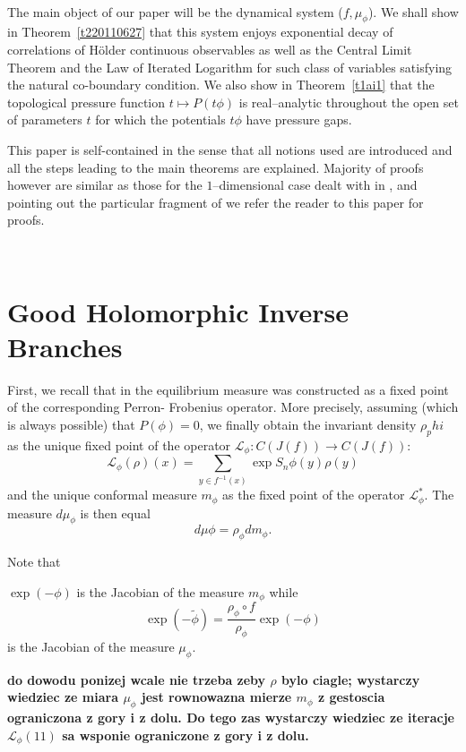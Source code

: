\documentclass[12pt]{amsart}
\numberwithin{equation}{section}
\newcommand{\nl}{\newline}
\def\1{1\!\!1}
\def\sp{\medskip}             \def\fr{\noindent}        \def\nl{\newline}
\begin{document}
\

\fr The main object of our paper will be the dynamical system
($f,\mu_\phi$). We shall show in Theorem~\ref{t220110627} that this
system enjoys exponential 
decay of correlations of H\"older continuous observables as well as
the Central Limit Theorem and the Law of Iterated Logarithm for such
class of variables satisfying the natural co-boundary condition. We
also show in Theorem~\ref{t1ai1} that the topological pressure
function $t\mapsto P(t\phi)$ 
is real--analytic throughout the open set of parameters $t$ for which
the potentials $t\phi$ have pressure gaps.

\sp\fr This paper is self-contained in the sense that all notions used
are introduced and all the steps leading to the main theorems are
explained. Majority of proofs however are similar as those for the
$1$--dimensional case dealt with in \cite{SUZ1}, and pointing out the
particular fragment of \cite{SUZ1} we refer the
reader to this paper for proofs.

\

\section{Good Holomorphic Inverse Branches}

First, we recall that in \cite{uzpk} the equilibrium measure was constructed as a fixed point of the corresponding Perron- Frobenius operator. More precisely, assuming (which is always possible) that $P(\phi)=0$, we finally obtain the invariant density $\rho_phi$ as the unique fixed point of the operator $\mathcal{L}_\phi:C(J(f))\to C(J(f))$:
$$\mathcal{L}_\phi(\rho)(x)=\sum_{y\in f^{-1}(x)}\exp S_n\phi(y)\rho(y)$$
and the unique conformal measure $m_\phi$ as the fixed point of the operator $\mathcal{L}_\phi^*$.
The measure $d\mu_\phi$ is then equal 
$$d\mu\phi=\rho_\phi d m_\phi.$$

Note that

$\exp(-\phi)$
is the Jacobian of the measure $m_\phi$
while
\begin{equation}\label{tilde}
\exp(-\tilde\phi)=\frac{\rho_\phi\circ f}{\rho_\phi}\exp(-\phi)
\end{equation}
is the Jacobian of the measure $\mu_\phi$.

{\bf do dowodu ponizej wcale nie trzeba zeby $\rho$ bylo ciagle; wystarczy wiedziec ze miara $\mu_\phi$ jest rownowazna mierze $m_\phi$ z gestoscia ograniczona z gory i z dolu. Do tego zas wystarczy wiedziec ze iteracje $\mathcal{L}_\phi(\1)$ sa wsponie ograniczone z gory i z dolu.}
\end{document}
